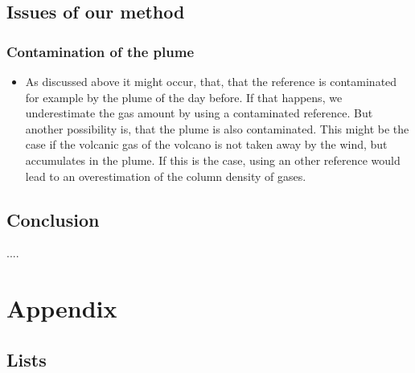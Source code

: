 \documentclass  [
  paper    = a4,
  BCOR     = 10mm,
  twoside,
  fontsize = 12pt,
  fleqn,
  toc      = bibnumbered,
  toc      = listofnumbered,
  numbers  = noendperiod,
  headings = normal,
  listof   = leveldown,
  version  = 3.03
]                                       {scrreprt}
\begin{document}
	\chapter{Issues of our method}
	
	\section{Contamination of the plume}
	\begin{itemize}
		\item As discussed above it might occur, that, that the reference is contaminated for example by the plume of the day before. If that happens, we underestimate the gas amount by using a contaminated reference. But another possibility is, that the plume is also contaminated. This might be the case if the volcanic gas of the volcano is not taken away by the wind, but accumulates in the plume. If this is the case, using an other reference would lead to an overestimation of the column density of gases.
	\end{itemize}

	\chapter{Conclusion}
	....
	
	
	



  \part{Appendix}
  \begin{appendix}
    \chapter{Lists}
    \listoffigures
    \listoftables
    {}
    
    
  \end{appendix}
\end{document}
